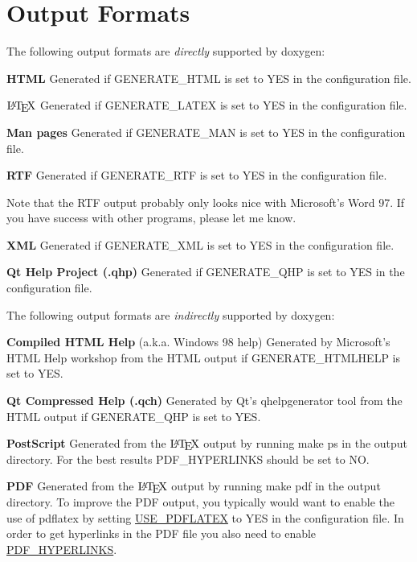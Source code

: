 \hypertarget{output_output_sec}{}\section{Output Formats}\label{output_output_sec}

The following output formats are {\itshape directly\/} supported by doxygen: 
\begin{DoxyDescription}
\item[{\bfseries HTML} ]Generated if {\ttfamily GENERATE\_\-HTML} is set to {\ttfamily YES} in the configuration file. 
\item[$\mbox{\LaTeX}$ ]Generated if {\ttfamily GENERATE\_\-LATEX} is set to {\ttfamily YES} in the configuration file. 
\item[{\bfseries Man pages} ]Generated if {\ttfamily GENERATE\_\-MAN} is set to {\ttfamily YES} in the configuration file. 
\item[{\bfseries RTF} ]Generated if {\ttfamily GENERATE\_\-RTF} is set to {\ttfamily YES} in the configuration file.

Note that the RTF output probably only looks nice with Microsoft's Word 97. If you have success with other programs, please let me know. 
\item[{\bfseries XML} ]Generated if {\ttfamily GENERATE\_\-XML} is set to {\ttfamily YES} in the configuration file.


\item[{\bfseries Qt Help Project (.qhp)} ]Generated if {\ttfamily GENERATE\_\-QHP} is set to {\ttfamily YES} in the configuration file. 
\end{DoxyDescription}

The following output formats are {\itshape indirectly\/} supported by doxygen: 
\begin{DoxyDescription}
\item[{\bfseries Compiled HTML Help} (a.k.a. Windows 98 help) ]Generated by Microsoft's HTML Help workshop from the HTML output if {\ttfamily GENERATE\_\-HTMLHELP} is set to {\ttfamily YES}. 
\item[{\bfseries Qt Compressed Help (.qch)} ]Generated by Qt's qhelpgenerator tool from the HTML output if {\ttfamily GENERATE\_\-QHP} is set to {\ttfamily YES}. 
\item[{\bfseries PostScript} ]Generated from the $\mbox{\LaTeX}$ output by running {\ttfamily make ps} in the output directory. For the best results {\ttfamily PDF\_\-HYPERLINKS} should be set to {\ttfamily NO}. 
\item[{\bfseries PDF} ]Generated from the $\mbox{\LaTeX}$ output by running {\ttfamily make pdf} in the output directory. To improve the PDF output, you typically would want to enable the use of {\ttfamily pdflatex} by setting \hyperlink{config_cfg_use_pdflatex}{USE\_\-PDFLATEX} to {\ttfamily YES} in the configuration file. In order to get hyperlinks in the PDF file you also need to enable \hyperlink{config_cfg_pdf_hyperlinks}{PDF\_\-HYPERLINKS}. 
\end{DoxyDescription}